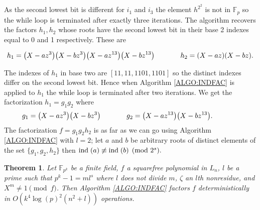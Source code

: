 \documentclass{article}
\let\originalleft\left
\let\originalright\right
\renewcommand{\left}{\mathopen{}\mathclose\bgroup\originalleft}
\renewcommand{\right}{\aftergroup\egroup\originalright}
\newcounter{dummy} \numberwithin{dummy}{section}
\theoremstyle{plain}
\newtheorem{thm}[dummy]{Theorem}
\theoremstyle{definition}
\def\Fp {{ \mathbb{F} _ {p} }}
\def\FpE {{ \mathbb{F} _ {p^k} }}
\def\bind {{ \mathrm{ind}\hspace{1 mm} }}
\begin{document}
		As the second lowest bit is different for $i_1$ and $i_3$ the element $h^{2^2}$ is not in $\Fp$ so the while loop is terminated after exactly three iterations. The algorithm recovers the factors $h_1,h_2$ whose roots have the second lowest bit in their base 2 indexes equal to 0 and 1 respectively. These are
		
		\[ 
		    h_1=\left(X-az^3\right)\left(X-bz^3\right)\left(X-az^{13}\right)\left(X-bz^{13}\right) \hspace{13 mm} h_2=\left(X-az\right)\left(X-bz\right). 
		\]
		
		The indexes of $h_1$ in base two are $[11,11,1101,1101]$ so the distinct indexes differ on the second lowest bit. Hence when Algorithm \ref{ALGO:INDFAC} is applied to $h_1$ the while loop is terminated after two iterations. We get the factorization $h_1=g_1g_2$ where
		\[ 
		    g_1=\left(X-az^3\right)\left(X-bz^3\right) \hspace{13 mm} g_2=\left(X-az^{13}\right)\left(X-bz^{13}\right). \hspace{13 mm} 
		\]
		The factorization $f = g_1 g_2 h_2$ is as far as we can go using Algorithm \ref{ALGO:INDFAC} with $l=2$; let $a$ and $b$ be arbitrary roots of distinct elements of the set $\{ g_1,g_2,h_2 \}$ then $\bind(a) \not\equiv \bind(b) \pmod {2^s}.$ 
		
		\begin{thm} 
		\label{THM:vonzurGathen}
		    Let $\FpE$ be a finite field, $f$ a squarefree polynomial in $L_n$, $l$ be a prime such that $p^k-1=ml^s$ where $l$ does not divide $m$, $\zeta$ an $l$th nonresidue, and $X^m \not= 1 \pmod f$. Then Algorithm \ref{ALGO:INDFAC} factors $f$ deterministically in $O(k^4\log(p)^2(n^2+l))$ operations. 
		\end{thm}
		
\end{document}
